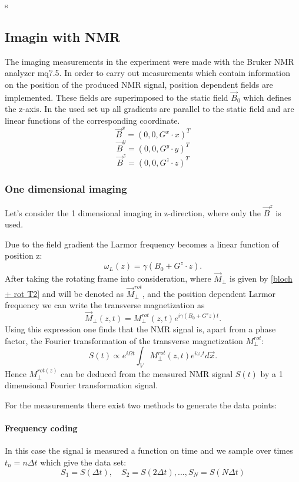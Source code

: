 s\subsection{Imagin with NMR}
The imaging measurements in the experiment were made with the Bruker NMR analyzer mq7.5. 
In order to carry out measurements which contain information on the position of the produced NMR signal, position dependent fields are implemented. These fields are superimposed to the static field $\vec{B}_0$ which defines the z-axis. In the used set up all gradients are parallel to the static field and are linear functions of the corresponding coordinate.
$$\vec{B}^x = (0,0,G^x\cdot x)^T$$
$$\vec{B}^y = (0,0,G^y\cdot y)^T$$
$$\vec{B}^z = (0,0,G^z\cdot z)^T$$
\subsubsection{One dimensional imaging}
Let's consider the  1 dimensional imaging in z-direction, where only the $\vec{B}^z$ is used.  

Due to the field gradient the Larmor frequency becomes a linear function of position z:
\begin{equation}
\omega_L(z) = \gamma(B_0 + G^z\cdot z).
\end{equation}
After taking the rotating frame into consideration, where $\vec{M}_\perp$ is given by \ref{bloch + rot T2} and will be denoted as $\vec{M}_\perp^{rot}$, and the position dependent Larmor frequency we can write the transverse magnetization as
\begin{equation}
\vec{M}_\perp(z, t) = M_\perp^{rot}(z,t)e^{i\gamma(B_0 + G^{z}z)t}.
\end{equation}
Using this expression one finds that the NMR signal is, apart from a phase factor, the Fourier transformation of the transverse magnetization $M_\perp^{rot}$:
\begin{equation}
S(t)\propto e^{i\Omega t} \int_{V} M_\perp^{rot}(z,t) e^{i\omega_z t} d\vec{x}.
\end{equation}
Hence $M_\perp^{rot(z)}$ can be deduced from the measured NMR signal $S(t)$ by a 1 dimensional Fourier transformation signal.

For the measurements there exist two methods to generate the data points:
\paragraph{Frequency coding}
In this case the signal is measured a function on time and we sample over times $t_n = n\Delta t$ which give the data set:
$$S_1 = S(\Delta t), \quad S_2 = S(2\Delta t), ..., S_N = S(N\Delta t)$$
